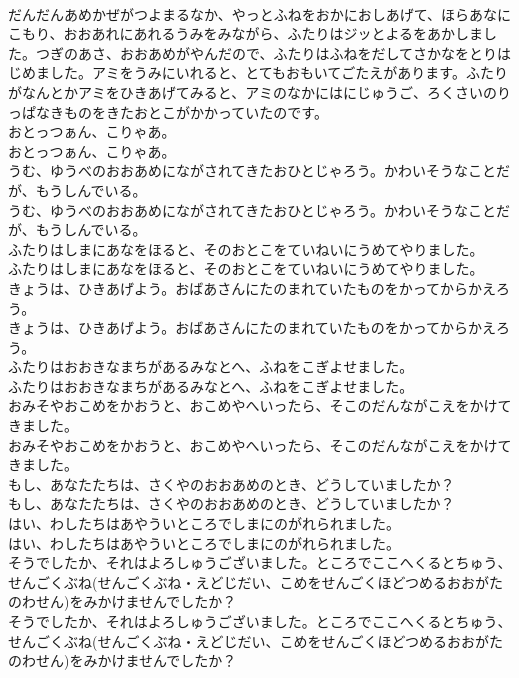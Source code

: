 \documentclass[8pt]{extreport}
\begin{document}
\begin{CJK}{UTF8}{min}
\\	だんだんあめかぜがつよまるなか、やっとふねをおかにおしあげて、ほらあなにこもり、おおあれにあれるうみをみながら、ふたりはジッとよるをあかしました。つぎのあさ、おおあめがやんだので、ふたりはふねをだしてさかなをとりはじめました。アミをうみにいれると、とてもおもいてごたえがあります。ふたりがなんとかアミをひきあげてみると、アミのなかにはにじゅうご、ろくさいのりっぱなきものをきたおとこがかかっていたのです。
\\	おとっつぁん、こりゃあ。
\\	おとっつぁん、こりゃあ。
\\	うむ、ゆうべのおおあめにながされてきたおひとじゃろう。かわいそうなことだが、もうしんでいる。
\\	うむ、ゆうべのおおあめにながされてきたおひとじゃろう。かわいそうなことだが、もうしんでいる。
\\	ふたりはしまにあなをほると、そのおとこをていねいにうめてやりました。
\\	ふたりはしまにあなをほると、そのおとこをていねいにうめてやりました。
\\	きょうは、ひきあげよう。おばあさんにたのまれていたものをかってからかえろう。
\\	きょうは、ひきあげよう。おばあさんにたのまれていたものをかってからかえろう。
\\	ふたりはおおきなまちがあるみなとへ、ふねをこぎよせました。
\\	ふたりはおおきなまちがあるみなとへ、ふねをこぎよせました。
\\	おみそやおこめをかおうと、おこめやへいったら、そこのだんながこえをかけてきました。
\\	おみそやおこめをかおうと、おこめやへいったら、そこのだんながこえをかけてきました。
\\	もし、あなたたちは、さくやのおおあめのとき、どうしていましたか？
\\	もし、あなたたちは、さくやのおおあめのとき、どうしていましたか？
\\	はい、わしたちはあやういところでしまにのがれられました。
\\	はい、わしたちはあやういところでしまにのがれられました。
\\	そうでしたか、それはよろしゅうございました。ところでここへくるとちゅう、せんごくぶね(せんごくぶね・えどじだい、こめをせんごくほどつめるおおがたのわせん)をみかけませんでしたか？
\\	そうでしたか、それはよろしゅうございました。ところでここへくるとちゅう、せんごくぶね(せんごくぶね・えどじだい、こめをせんごくほどつめるおおがたのわせん)をみかけませんでしたか？

\end{CJK}
\end{document}
